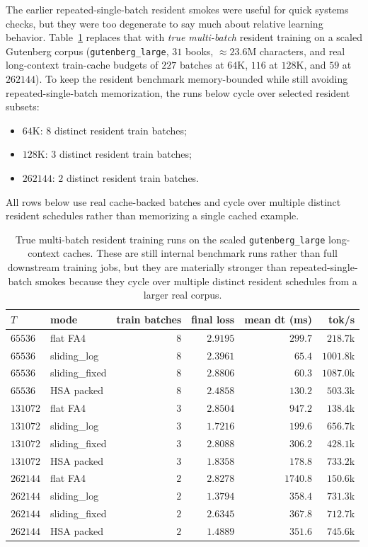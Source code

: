 \documentclass[11pt]{article}
\begin{document}
The earlier repeated-single-batch resident smokes were useful for quick systems
checks, but they were too degenerate to say much about relative learning
behavior. Table~\ref{tab:true-multibatch-resident} replaces that with
\emph{true multi-batch} resident training on a scaled Gutenberg corpus
(\texttt{gutenberg\_large}, $31$ books, $\approx 23.6$M characters, and real
long-context train-cache budgets of $227$ batches at $64$K, $116$ at $128$K,
and $59$ at $262144$). To keep the resident benchmark memory-bounded while
still avoiding repeated-single-batch memorization, the runs below cycle over
selected resident subsets:
\begin{itemize}[leftmargin=1.5em]
    \item $64$K: $8$ distinct resident train batches;
    \item $128$K: $3$ distinct resident train batches;
    \item $262144$: $2$ distinct resident train batches.
\end{itemize}
All rows below use real cache-backed batches and cycle over multiple distinct
resident schedules rather than memorizing a single cached example.

\begin{table}[ht]
\centering
\begin{tabular}{llrrrr}
\toprule
$T$ & mode & train batches & final loss & mean dt (ms) & tok/s \\
\midrule
$65536$ & flat FA4 & $8$ & $2.9195$ & $299.7$ & $218.7$k \\
$65536$ & sliding\_log & $8$ & $2.3961$ & $65.4$ & $1001.8$k \\
$65536$ & sliding\_fixed & $8$ & $2.8806$ & $60.3$ & $1087.0$k \\
$65536$ & HSA packed & $8$ & $2.4858$ & $130.2$ & $503.3$k \\
\midrule
$131072$ & flat FA4 & $3$ & $2.8504$ & $947.2$ & $138.4$k \\
$131072$ & sliding\_log & $3$ & $1.7216$ & $199.6$ & $656.7$k \\
$131072$ & sliding\_fixed & $3$ & $2.8088$ & $306.2$ & $428.1$k \\
$131072$ & HSA packed & $3$ & $1.8358$ & $178.8$ & $733.2$k \\
\midrule
$262144$ & flat FA4 & $2$ & $2.8278$ & $1740.8$ & $150.6$k \\
$262144$ & sliding\_log & $2$ & $1.3794$ & $358.4$ & $731.3$k \\
$262144$ & sliding\_fixed & $2$ & $2.6345$ & $367.8$ & $712.7$k \\
$262144$ & HSA packed & $2$ & $1.4889$ & $351.6$ & $745.6$k \\
\bottomrule
\end{tabular}
\caption{True multi-batch resident training runs on the scaled
\texttt{gutenberg\_large} long-context caches. These are still internal
benchmark runs rather than full downstream training jobs, but they are
materially stronger than repeated-single-batch smokes because they cycle over
multiple distinct resident schedules from a larger real corpus.}
\label{tab:true-multibatch-resident}
\end{table}
\end{document}

